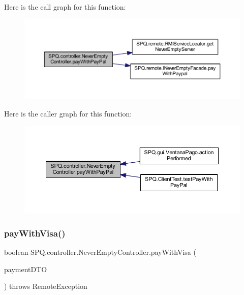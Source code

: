 Here is the call graph for this function\+:
\nopagebreak
\begin{figure}[H]
\begin{center}
\leavevmode
\includegraphics[width=350pt]{class_s_p_q_1_1controller_1_1_never_empty_controller_aefc0dae2c43c2960719176d390f3ad9c_cgraph}
\end{center}
\end{figure}
Here is the caller graph for this function\+:
\nopagebreak
\begin{figure}[H]
\begin{center}
\leavevmode
\includegraphics[width=350pt]{class_s_p_q_1_1controller_1_1_never_empty_controller_aefc0dae2c43c2960719176d390f3ad9c_icgraph}
\end{center}
\end{figure}
\mbox{\label{class_s_p_q_1_1controller_1_1_never_empty_controller_a79b4d6042b76ad3aee7f11d104d813d6}} 
\subsubsection{\texorpdfstring{pay\+With\+Visa()}{payWithVisa()}}
{\footnotesize\ttfamily boolean S\+P\+Q.\+controller.\+Never\+Empty\+Controller.\+pay\+With\+Visa (\begin{DoxyParamCaption}\item[{\mbox{\hyperlink{class_s_p_q_1_1dto_1_1_payment_d_t_o}{Payment\+D\+TO}}}]{payment\+D\+TO }\end{DoxyParamCaption}) throws Remote\+Exception}


